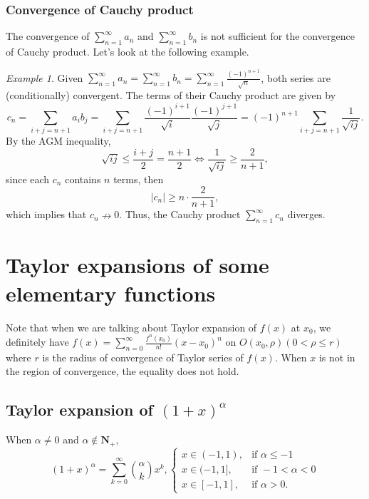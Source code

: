 \documentclass{article}
\theoremstyle{remark}
\newtheorem{example}[thm]{Example}
\begin{document}
\subsubsection{Convergence of Cauchy product}
The convergence of $\sum_{n=1}^{\infty}a_n$ and $\sum_{n=1}^{\infty}b_n$ is not sufficient for the convergence of Cauchy product. Let's look at the following example.
\begin{example}
Given $\sum_{n=1}^{\infty}a_n=\sum_{n=1}^{\infty}b_n=\sum_{n=1}^{\infty}\frac{(-1)^{n+1}}{\sqrt{n}}$, both series are (conditionally) convergent. The terms of their Cauchy product are given by
\[
c_n=\sum_{i+j=n+1}a_ib_j=\sum_{i+j=n+1}\frac{(-1)^{i+1}}{\sqrt{i}}\frac{(-1)^{j+1}}{\sqrt{j}}=(-1)^{n+1}\sum_{i+j=n+1}\frac{1}{\sqrt{ij}}.
\]
By the AGM inequality,
\[
\sqrt{ij}\le \frac{i+j}{2}=\frac{n+1}{2}\Longleftrightarrow \frac{1}{\sqrt{ij}}\ge \frac{2}{n+1},
\]
since each $c_n$ contains $n$ terms, then
\[
|c_n|\ge n\cdot\frac{2}{n+1},
\]
which implies that $c_n\nrightarrow 0$. Thus, the Cauchy product $\sum_{n=1}^{\infty}c_n$ diverges.
\end{example}



\section{Taylor expansions of some elementary functions}
Note that when we are talking about Taylor expansion of $f(x)$ at $x_0$, we definitely have $f(x)=\sum_{n=0}^{\infty}\frac{f^{n}(x_0)}{n!} (x-x_0)^n$ on $O(x_0,\rho)(0<\rho\le r)$ where $r$ is the radius of convergence of Taylor series of $f(x)$. When $x$ is not in the region of convergence, the equality does not hold.
\subsection{Taylor expansion of $(1+x)^{\alpha}$}
When $\alpha\neq0$ and $\alpha\notin \mathbf{N}_+$,
\[
(1+x)^{\alpha}=\sum_{k=0}^{\infty}\binom{\alpha}{k}x^k, \begin{cases}
                                                          x\in(-1,1), & \mbox{if } \alpha\le -1 \\
                                                          x\in(-1,1], & \mbox{if } -1<\alpha<0 \\
                                                          x\in[-1,1], & \mbox{if } \alpha>0.
                                                        \end{cases}
\]
\end{document}
